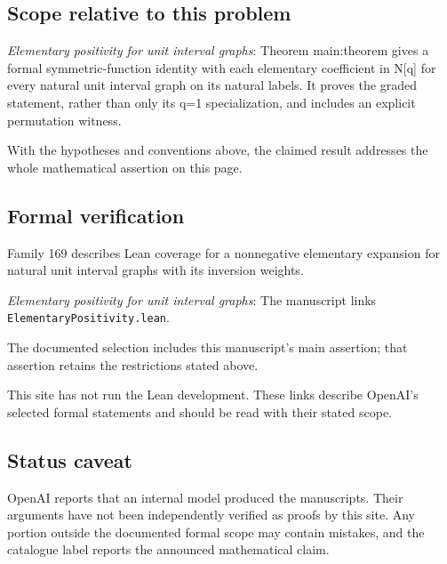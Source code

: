 \documentclass[11pt]{article}
\begin{document}
\subsection{Scope relative to this problem}
\textit{Elementary positivity for unit interval graphs}: Theorem main:theorem gives a formal symmetric-function identity with each elementary coefficient in N[q] for every natural unit interval graph on its natural labels. It proves the graded statement, rather than only its q=1 specialization, and includes an explicit permutation witness.

With the hypotheses and conventions above, the claimed result addresses the whole mathematical assertion on this page.

\subsection{Formal verification}
Family 169 describes Lean coverage for a nonnegative elementary expansion for natural unit interval graphs with its inversion weights.

\textit{Elementary positivity for unit interval graphs}: The manuscript links \texttt{ElementaryPositivity.lean}.

The documented selection includes this manuscript’s main assertion; that assertion retains the restrictions stated above.

This site has not run the Lean development. These links describe OpenAI’s selected formal statements and should be read with their stated scope.

\subsection{Status caveat}
OpenAI reports that an internal model produced the manuscripts. Their arguments have not been independently verified as proofs by this site. Any portion outside the documented formal scope may contain mistakes, and the catalogue label reports the announced mathematical claim.
\end{document}
